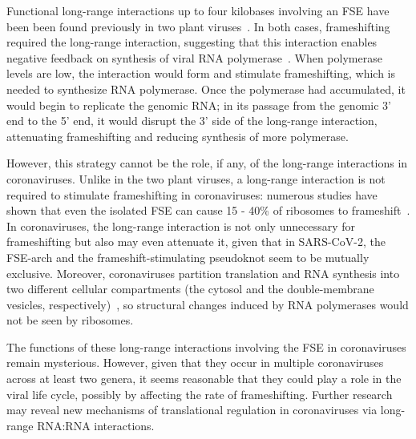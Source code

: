 \documentclass[main.tex]{subfiles}
\begin{document}
Functional long-range interactions up to four kilobases involving an FSE have been been found previously in two plant viruses~\cite{Barry2002,Tajima2011}. In both cases, frameshifting required the long-range interaction, suggesting that this interaction enables negative feedback on synthesis of viral RNA polymerase~\cite{Barry2002}. When polymerase levels are low, the interaction would form and stimulate frameshifting, which is needed to synthesize RNA polymerase. Once the polymerase had accumulated, it would begin to replicate the genomic RNA; in its passage from the genomic 3' end to the 5' end, it would disrupt the 3' side of the long-range interaction, attenuating frameshifting and reducing synthesis of more polymerase.

However, this strategy cannot be the role, if any, of the long-range interactions in coronaviruses. Unlike in the two plant viruses, a long-range interaction is not required to stimulate frameshifting in coronaviruses: numerous studies have shown that even the isolated FSE can cause 15 - 40\% of ribosomes to frameshift~\cite{Bhatt2021,Haniff2020,Kelly2020,Lan2022,Plant2010,YSun2021,KZhang2021}. In coronaviruses, the long-range interaction is not only unnecessary for frameshifting but also may even attenuate it, given that in SARS-CoV-2, the FSE-arch and the frameshift-stimulating pseudoknot seem to be mutually exclusive. Moreover, coronaviruses partition translation and RNA synthesis into two different cellular compartments (the cytosol and the double-membrane vesicles, respectively)~\cite{Wolff2020}, so structural changes induced by RNA polymerases would not be seen by ribosomes.

The functions of these long-range interactions involving the FSE in coronaviruses remain mysterious. However, given that they occur in multiple coronaviruses across at least two genera, it seems reasonable that they could play a role in the viral life cycle, possibly by affecting the rate of frameshifting. Further research may reveal new mechanisms of translational regulation in coronaviruses via long-range RNA:RNA interactions.
\end{document}
